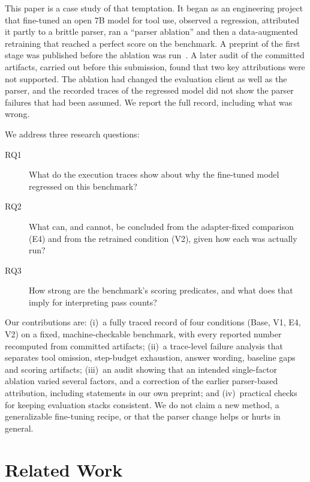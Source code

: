 \documentclass[runningheads]{llncs}
\begin{document}
This paper is a case study of that temptation. It began as an engineering project that fine-tuned an open 7B model for tool use, observed a regression, attributed it partly to a brittle parser, ran a ``parser ablation'' and then a data-augmented retraining that reached a perfect score on the benchmark. A preprint of the first stage was published before the ablation was run~\cite{l2026agentrunpreprint}. A later audit of the committed artifacts, carried out before this submission, found that two key attributions were not supported. The ablation had changed the evaluation client as well as the parser, and the recorded traces of the regressed model did not show the parser failures that had been assumed. We report the full record, including what was wrong.

We address three research questions:
\begin{description}
\item[RQ1] What do the execution traces show about why the fine-tuned model regressed on this benchmark?
\item[RQ2] What can, and cannot, be concluded from the adapter-fixed comparison (E4) and from the retrained condition (V2), given how each was actually run?
\item[RQ3] How strong are the benchmark's scoring predicates, and what does that imply for interpreting pass counts?
\end{description}

Our contributions are: (i)~a fully traced record of four conditions (Base, V1, E4, V2) on a fixed, machine-checkable benchmark, with every reported number recomputed from committed artifacts; (ii)~a trace-level failure analysis that separates tool omission, step-budget exhaustion, answer wording, baseline gaps and scoring artifacts; (iii)~an audit showing that an intended single-factor ablation varied several factors, and a correction of the earlier parser-based attribution, including statements in our own preprint; and (iv)~practical checks for keeping evaluation stacks consistent. We do not claim a new method, a generalizable fine-tuning recipe, or that the parser change helps or hurts in general.

\section{Related Work}
\label{sec:related}
\end{document}

